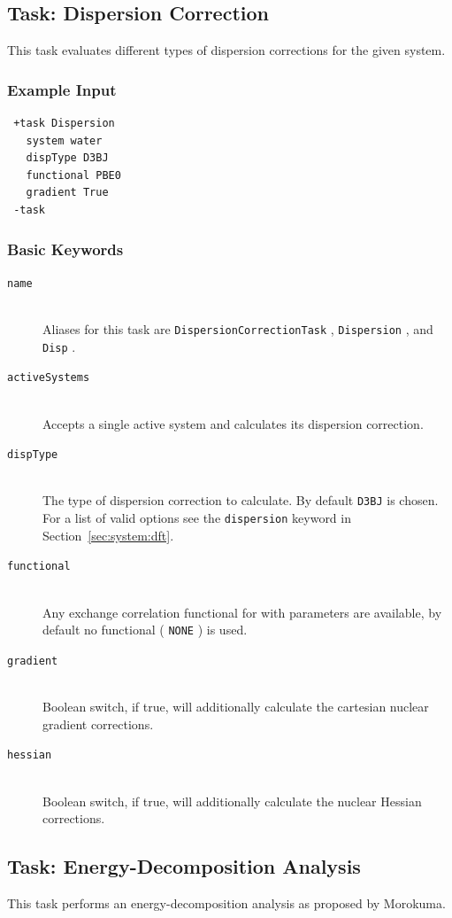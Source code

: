 \documentclass[bibliography=totocnumbered,a4paper,10pt,oneside]{scrbook}
\newcommand{\ttt}[1]{%
  \begingroup\setlength{\fboxsep}{1pt}%
  \colorbox{serenity-green!30}{\texttt{\hspace*{2pt}\vphantom{(g}#1\hspace*{2pt}}}%
  \endgroup
}
\begin{document}
\subsection{Task: Dispersion Correction}
This task evaluates different types of dispersion corrections for the given system.
\subsubsection{Example Input}
\begin{lstlisting}
 +task Dispersion
   system water
   dispType D3BJ
   functional PBE0
   gradient True
 -task
\end{lstlisting}
\subsubsection{Basic Keywords}
\begin{description}
  \item [\texttt{name}]\hfill \\
    Aliases for this task are \ttt{DispersionCorrectionTask}, \ttt{Dispersion},  and \ttt{Disp}.
  \item [\texttt{activeSystems}]\hfill \\
    Accepts a single active system and calculates its dispersion correction.
  \item [\texttt{dispType}]\hfill \\
    The type of dispersion correction to calculate. By default \ttt{D3BJ} is chosen.
    For a list of valid options see the \ttt{dispersion} keyword in Section~\ref{sec:system:dft}.
  \item [\texttt{functional}]\hfill \\
    Any exchange correlation functional for with parameters are available, by default no functional (\ttt{NONE}) is used.
  \item [\texttt{gradient}]\hfill \\
    Boolean switch, if true, will additionally calculate the cartesian nuclear gradient corrections.
  \item [\texttt{hessian}]\hfill \\
    Boolean switch, if true, will additionally calculate the nuclear Hessian corrections.
\end{description}

\subsection{Task: Energy-Decomposition Analysis}
This task performs an energy-decomposition analysis as proposed by Morokuma\cite{Morokuma1971}.
\end{document}
